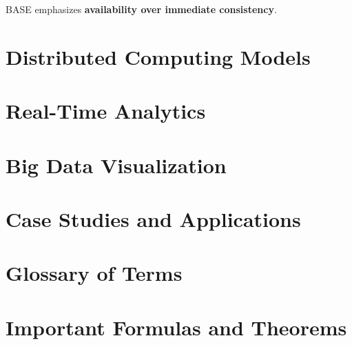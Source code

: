 \documentclass[12pt,a4paper]{report}
\begin{document}
BASE emphasizes \textbf{availability over immediate consistency}.

\chapter{Distributed Computing Models}

\chapter{Real-Time Analytics}

\chapter{Big Data Visualization}

\chapter{Case Studies and Applications}

\appendix
\chapter{Glossary of Terms}

\chapter{Important Formulas and Theorems}
\end{document}
